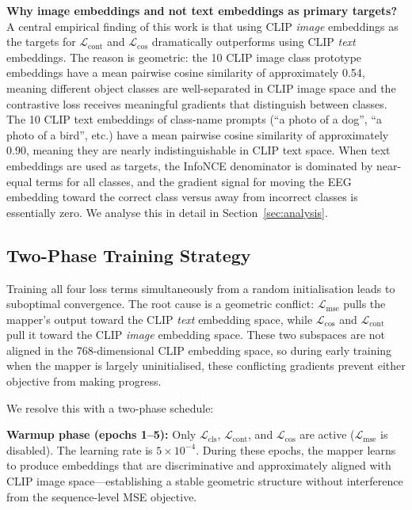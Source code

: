 \documentclass{article}
\begin{document}
\textbf{Why image embeddings and not text embeddings as primary targets?}
A central empirical finding of this work is that using CLIP \emph{image} embeddings as the targets for $\mathcal{L}_\mathrm{cont}$ and $\mathcal{L}_\mathrm{cos}$ dramatically outperforms using CLIP \emph{text} embeddings. The reason is geometric: the 10 CLIP image class prototype embeddings have a mean pairwise cosine similarity of approximately 0.54, meaning different object classes are well-separated in CLIP image space and the contrastive loss receives meaningful gradients that distinguish between classes. The 10 CLIP text embeddings of class-name prompts (``a photo of a dog'', ``a photo of a bird'', etc.) have a mean pairwise cosine similarity of approximately 0.90, meaning they are nearly indistinguishable in CLIP text space. When text embeddings are used as targets, the InfoNCE denominator is dominated by near-equal terms for all classes, and the gradient signal for moving the EEG embedding toward the correct class versus away from incorrect classes is essentially zero. We analyse this in detail in Section~\ref{sec:analysis}.

\subsection{Two-Phase Training Strategy}
\label{sec:training}

Training all four loss terms simultaneously from a random initialisation leads to suboptimal convergence. The root cause is a geometric conflict: $\mathcal{L}_\mathrm{mse}$ pulls the mapper's output toward the CLIP \emph{text} embedding space, while $\mathcal{L}_\mathrm{cos}$ and $\mathcal{L}_\mathrm{cont}$ pull it toward the CLIP \emph{image} embedding space. These two subspaces are not aligned in the 768-dimensional CLIP embedding space, so during early training when the mapper is largely uninitialised, these conflicting gradients prevent either objective from making progress.

We resolve this with a two-phase schedule:

\textbf{Warmup phase (epochs 1--5):} Only $\mathcal{L}_\mathrm{cls}$, $\mathcal{L}_\mathrm{cont}$, and $\mathcal{L}_\mathrm{cos}$ are active ($\mathcal{L}_\mathrm{mse}$ is disabled). The learning rate is $5 \times 10^{-4}$. During these epochs, the mapper learns to produce embeddings that are discriminative and approximately aligned with CLIP image space---establishing a stable geometric structure without interference from the sequence-level MSE objective.
\end{document}
